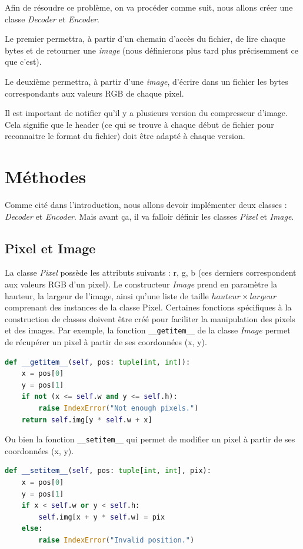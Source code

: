 \documentclass[utf8]{article}
\begin{document}
Afin de résoudre ce problème, on va procéder comme suit, nous allons créer une classe \textit{Decoder} et \textit{Encoder}. 

Le premier permettra, à partir d'un chemain d'accès du fichier, de lire chaque bytes et de retourner une \textit{image} (nous définierons plus tard plus précisemment ce que c'est).  

Le deuxième permettra, à partir d'une \textit{image}, d'écrire dans un fichier les bytes correspondants aux valeurs RGB de chaque pixel.

Il est important de notifier qu'il y a plusieurs version du compresseur d'image. Cela signifie que le header (ce qui se trouve à chaque début de fichier pour reconnaitre le format du fichier) doit être adapté à chaque version.


\section{Méthodes}
Comme cité dans l'introduction, nous allons devoir implémenter deux classes : \textit{Decoder} et \textit{Encoder}. Mais avant ça, il va falloir définir les classes \textit{Pixel} et \textit{Image}. 
\subsection{Pixel et Image}
La classe \textit{Pixel} possède les attributs suivants : r, g, b (ces derniers correspondent aux valeurs RGB d'un pixel). 
Le constructeur \textit{Image} prend en paramètre la hauteur, la largeur de l'image, ainsi qu'une liste de taille $hauteur \times largeur$ comprenant des instances de la classe Pixel.
Certaines fonctions spécifiques à la construction de classes doivent être créé pour faciliter la manipulation des pixels et des images. Par exemple, la fonction \texttt{__getitem__} de la classe \textit{Image} permet de récupérer un pixel à partir de ses coordonnées (x, y).

\begin{lstlisting}[language=Python, basicstyle=\small]
def __getitem__(self, pos: tuple[int, int]):
    x = pos[0]
    y = pos[1]
    if not (x <= self.w and y <= self.h):
        raise IndexError("Not enough pixels.")
    return self.img[y * self.w + x]

\end{lstlisting}

Ou bien la fonction \texttt{__setitem__} qui permet de modifier un pixel à partir de ses coordonnées (x, y).
\begin{lstlisting}[language=Python, basicstyle=\small]
 def __setitem__(self, pos: tuple[int, int], pix):
    x = pos[0]
    y = pos[1]
    if x < self.w or y < self.h:
        self.img[x + y * self.w] = pix
    else:
        raise IndexError("Invalid position.")

\end{lstlisting}
\end{document}
